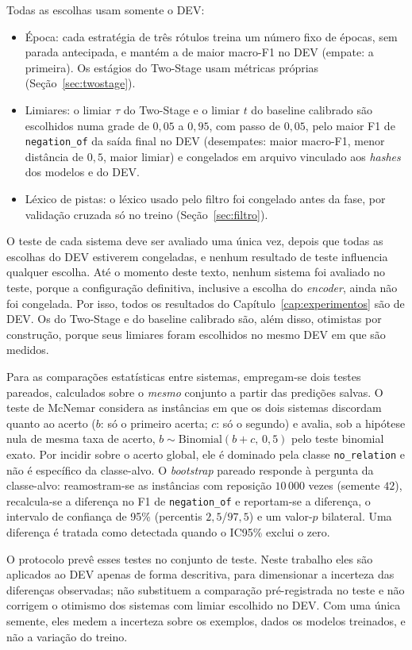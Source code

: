 Todas as escolhas usam somente o DEV:

\begin{itemize}
  \item Época: cada estratégia de três rótulos treina um número fixo de
        épocas, sem parada antecipada, e mantém a de maior macro-F1 no DEV (empate:
        a primeira). Os estágios do Two-Stage usam métricas próprias
        (Seção~\ref{sec:twostage}).
  \item Limiares: o limiar $\tau$ do Two-Stage e o limiar $t$ do baseline
        calibrado são escolhidos numa grade de $0{,}05$ a $0{,}95$, com passo de
        $0{,}05$, pelo maior F1 de \texttt{negation\_of} da saída final no DEV
        (desempates: maior macro-F1, menor distância de $0{,}5$, maior limiar) e
        congelados em arquivo vinculado aos \emph{hashes} dos modelos e do DEV.
  \item Léxico de pistas: o léxico usado pelo filtro foi congelado antes
        da fase, por validação cruzada só no treino (Seção~\ref{sec:filtro}).
\end{itemize}

O teste de cada sistema deve ser avaliado uma única vez, depois que todas as
escolhas do DEV estiverem congeladas, e nenhum resultado de teste influencia qualquer
escolha. Até o momento deste texto, nenhum sistema foi avaliado no teste,
porque a configuração definitiva, inclusive a escolha do \emph{encoder}, ainda não
foi congelada. Por isso, todos os resultados do Capítulo~\ref{cap:experimentos} são
de DEV. Os do Two-Stage e do baseline calibrado são, além disso, otimistas
por construção, porque seus limiares foram escolhidos no mesmo DEV em que são
medidos.

\label{sec:avaliacao}
Para as comparações estatísticas entre sistemas, empregam-se dois testes pareados, calculados sobre o
\emph{mesmo} conjunto a partir das predições salvas. O teste de McNemar
\cite{dietterich_1998_mcnemar} considera as instâncias em que os dois sistemas
discordam quanto ao acerto ($b$: só o primeiro acerta; $c$: só o segundo) e avalia,
sob a hipótese nula de mesma taxa de acerto, $b \sim \mathrm{Binomial}(b+c,\,0{,}5)$
pelo teste binomial exato. Por incidir sobre o acerto global, ele é dominado pela
classe \texttt{no\_relation} e não é específico da classe-alvo. O
\emph{bootstrap} pareado responde à pergunta da classe-alvo: reamostram-se as
instâncias com reposição $10\,000$ vezes (semente $42$), recalcula-se a diferença no
F1 de \texttt{negation\_of} e reportam-se a diferença, o intervalo de confiança de
95\% (percentis $2{,}5$/$97{,}5$) e um valor-$p$ bilateral. Uma diferença é tratada
como detectada quando o IC95\% exclui o zero.

O protocolo prevê esses testes no conjunto de teste. Neste trabalho eles são
aplicados ao DEV apenas de forma descritiva, para dimensionar a incerteza
das diferenças observadas; não substituem a comparação pré-registrada no teste e não
corrigem o otimismo dos sistemas com limiar escolhido no DEV. Com uma única semente,
eles medem a incerteza sobre os exemplos, dados os modelos treinados, e não a
variação do treino.
